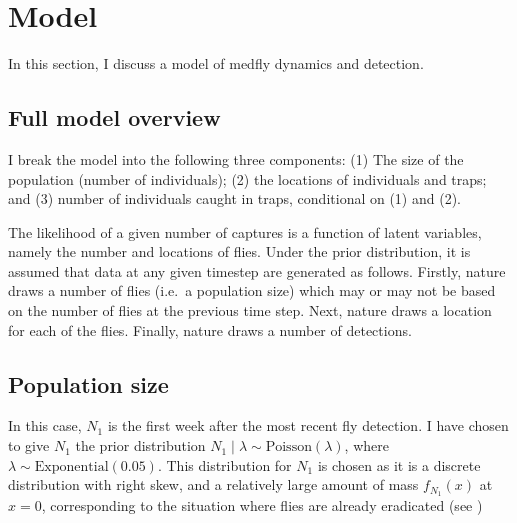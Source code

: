 \documentclass[
]{book}
\begin{document}
\hypertarget{model}{%
\section{Model}\label{model}}

In this section, I discuss a model of medfly dynamics and detection.

\hypertarget{full-model-overview}{%
\subsection{Full model overview}\label{full-model-overview}}

I break the model into the following three components: (1) The size of the population (number of individuals); (2) the locations of individuals and traps; and (3) number of individuals caught in traps, conditional on (1) and (2).

The likelihood of a given number of captures is a function of latent variables, namely the number and locations of flies. Under the prior distribution, it is assumed that data at any given timestep are generated as follows. Firstly, nature draws a number of flies (i.e.~a population size) which may or may not be based on the number of flies at the previous time step. Next, nature draws a location for each of the flies. Finally, nature draws a number of detections.

\hypertarget{population-size-1}{%
\subsection{Population size}\label{population-size-1}}

In this case, \(N_1\) is the first week after the most recent fly detection. I have chosen to give \(N_1\) the prior distribution \(N_1 \mid \lambda \sim \mathrm{Poisson}(\lambda)\), where \(\lambda \sim \mathrm{Exponential}(0.05)\). This distribution for \(N_1\) is chosen as it is a discrete distribution with right skew, and a relatively large amount of mass \(f_{N_1}(x)\) at \(x = 0\), corresponding to the situation where flies are already eradicated (see \citet{prior_init_size})
\end{document}
